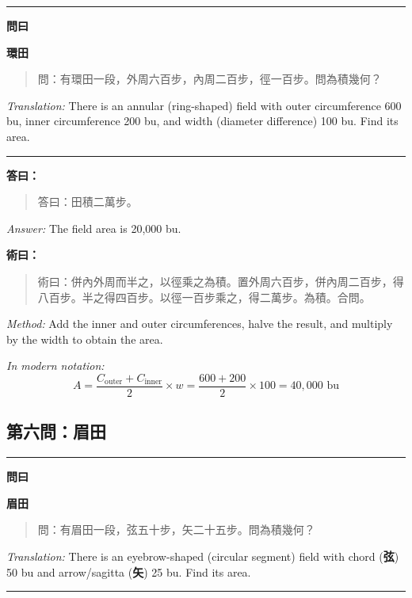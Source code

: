 \documentclass[11pt,a4paper]{article}
\newenvironment{problem}[1][]{%
  \medskip\noindent\rule{\textwidth}{0.4pt}%
  \par\noindent\textbf{\color{sectioncolor}#1}\par\nopagebreak%
  \smallskip%
}{%
  \par\noindent\rule{\textwidth}{0.4pt}\medskip%
}
\newenvironment{answer}{%
  \medskip\noindent{\color{answercolor}\rule{0.5\textwidth}{0.5pt}}%
  \par\color{answercolor}%
}{%
  \par\medskip%
}
\newenvironment{method}{%
  \medskip\noindent{\color{methodcolor}\rule{0.5\textwidth}{0.5pt}}%
  \par\color{methodcolor}%
}{%
  \par\medskip%
}
\begin{document}
\begin{problem}[\textbf{問曰}]
\textbf{\color{sectioncolor}環田}

\begin{quote}
\textcolor{chinacolor}{%
問：有環田一段，外周六百步，內周二百步，徑一百步。問為積幾何？
}
\end{quote}

\textit{Translation:} There is an annular (ring-shaped) field with outer 
circumference 600 bu, inner circumference 200 bu, and width (diameter 
difference) 100 bu. Find its area.
\end{problem}

\begin{answer}
\textbf{答曰：}

\begin{quote}
\textcolor{chinacolor}{%
答曰：田積二萬步。
}
\end{quote}

\textit{Answer:} The field area is 20,000 bu.
\end{answer}

\begin{method}
\textbf{術曰：}

\begin{quote}
\textcolor{chinacolor}{%
術曰：併內外周而半之，以徑乘之為積。置外周六百步，併內周二百步，得八百步。半之得四百步。以徑一百步乘之，得二萬步。為積。合問。
}
\end{quote}

\textit{Method:} Add the inner and outer circumferences, halve the result, 
and multiply by the width to obtain the area.

\medskip
\textit{In modern notation:}
\[
A = \frac{C_{\text{outer}} + C_{\text{inner}}}{2} \times w = \frac{600+200}{2} \times 100 = 40{,}000 \text{ bu}
\]
\end{method}

\subsection*{第六問：眉田}

\begin{problem}[\textbf{問曰}]
\textbf{\color{sectioncolor}眉田}

\begin{quote}
\textcolor{chinacolor}{%
問：有眉田一段，弦五十步，矢二十五步。問為積幾何？
}
\end{quote}

\textit{Translation:} There is an eyebrow-shaped (circular segment) field 
with chord (\textbf{弦}) 50 bu and arrow/sagitta (\textbf{矢}) 25 bu. Find its area.
\end{problem}
\end{document}
